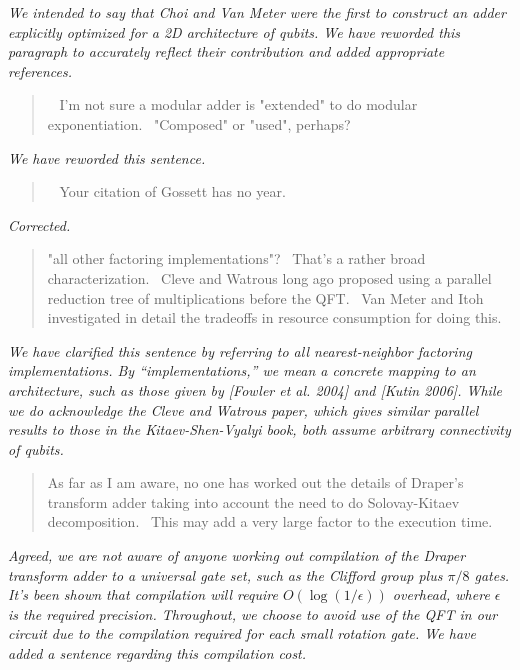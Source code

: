 \documentclass{article}
\theoremstyle{plain} \newtheorem{lemma}{Lemma}
\begin{document}
{\it 
We intended to say that Choi and Van Meter were the first to construct an adder explicitly optimized for a 2D architecture of qubits.
We have reworded this paragraph to accurately reflect their contribution and added appropriate references.}


\begin{quote}
  I'm not sure a modular adder is "extended" to do modular
exponentiation.  "Composed" or "used", perhaps?
\end{quote}

{\it We have reworded this sentence.}

\begin{quote}
  Your citation of Gossett has no year.
\end{quote}

{\it Corrected.}

\begin{quote}
"all other factoring implementations"?  That's a rather broad
characterization.  Cleve and Watrous long ago proposed using a
parallel reduction tree of multiplications before the QFT.  Van Meter
and Itoh investigated in detail the tradeoffs in resource consumption
for doing this.
\end{quote}

{\it We have clarified this sentence by referring to all nearest-neighbor factoring
implementations. By ``implementations,'' we mean a concrete mapping to an
architecture, such as those given by [Fowler et al. 2004] and [Kutin 2006].
While we do acknowledge the Cleve and Watrous paper, which gives
similar parallel results to those in the Kitaev-Shen-Vyalyi book, both
assume arbitrary connectivity of qubits.}

\begin{quote}
As far as I am aware, no one has worked out the details of Draper's
transform adder taking into account the need to do Solovay-Kitaev
decomposition.  This may add a very large factor to the execution
time.
\end{quote}

{\it Agreed, we are not aware of anyone working out compilation of the Draper
transform adder to a universal gate set, such as the Clifford group plus
$\pi/8$ gates. It's been shown that compilation will require $O(\log (1/\epsilon))$ overhead, where $\epsilon$ is the required precision. 
Throughout, we choose to avoid use of the QFT in our circuit due to the compilation required for each small rotation gate.  We have added a sentence regarding this compilation cost.
}
\end{document}
